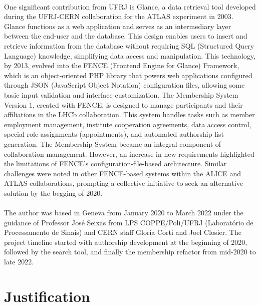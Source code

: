 \paragraph{}  One significant contribution from UFRJ is Glance, a data retrieval tool developed during the UFRJ-CERN collaboration for the ATLAS experiment in 2003. Glance functions as a web application and serves as an intermediary layer between the end-user and the database. This design enables users to insert and retrieve information from the database without requiring SQL (Structured Query Language) knowledge, simplifying data access and manipulation. This technology, by 2013, evolved into the FENCE (Frontend Engine for Glance) Framework, which is an object-oriented PHP library that powers web applications configured through JSON (JavaScript Object Notation) configuration files, allowing some basic input validation and interface customization. The Membership System Version 1, created with FENCE, is designed to manage participants and their affiliations in the LHCb collaboration. This system handles tasks such as member employment management, institute cooperation agreements, data access control, special role assignments (appointments), and automated authorship list generation. The Membership System became an integral component of collaboration management. However, an increase in new requirements highlighted the limitations of FENCE's configuration-file-based architecture. Similar challenges were noted in other FENCE-based systems within the ALICE and ATLAS collaborations, prompting a collective initiative to seek an alternative solution by the begging of 2020.

\paragraph{}The author was based in Geneva from January 2020 to March 2022 under the guidance of Professor José Seixas from LPS COPPE/Poli/UFRJ (Laboratório de Processamento de Sinais) and CERN staff Gloria Corti and Joel Closier. The project timeline started with authorship development at the beginning of 2020, followed by the search tool, and finally the membership refactor from mid-2020 to late 2022.

\section{Justification}

